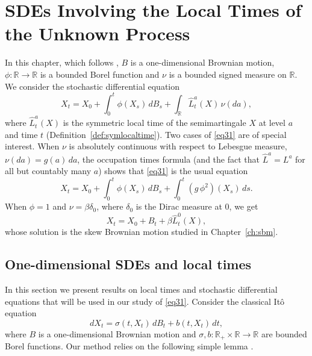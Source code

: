 \chapter{SDEs Involving the Local Times of the Unknown Process}\label{ch:local-times-unknown}

In this chapter, which follows \citet{LeGall1984}, $B$ is a one-dimensional
Brownian motion, $\phi:\mathbb{R}\to \mathbb{R}$ is a bounded Borel function
and $\nu$ is a bounded signed measure on $\mathbb{R}$. We consider the
stochastic differential equation
\begin{equation}\label{eq31}
	X_t=X_0 +\int_0^t \phi(X_s)\,dB_s+\int_\mathbb{R} \hat{L}_t^a (X)\, \nu(da),
\end{equation}
where $\hat{L}_t^a (X)$ is the symmetric local time of the semimartingale $X$ at
level $a$ and time $t$ (Definition~\ref{def:symlocaltime}). Two cases of
\eqref{eq31} are of special interest. When $\nu$ is absolutely continuous with
respect to Lebesgue measure, $\nu(da)=g(a)\,da$, the occupation times formula
(and the fact that $\hat{L}^a = L^a$ for all but countably many $a$) shows that
\eqref{eq31} is the usual equation
\begin{equation}\label{eq32}
	X_t=X_0 +\int_0^t \phi(X_s)\,dB_s+\int_0^t (g\, \phi^2)(X_s)\,ds .
\end{equation}
When $\phi=1$ and $\nu=\beta \delta_0$, where $\delta_0$ is the Dirac measure at
$0$, we get
\begin{equation}\label{eq33}
	X_t= X_0 + B_t + \beta \hat{L}_t^0 (X),
\end{equation}
whose solution is the skew Brownian motion studied in Chapter~\ref{ch:sbm}.

\section{One-dimensional SDEs and local times}

In this section we present results on local times and stochastic differential
equations that will be used in our study of \eqref{eq31}. Consider the
classical It\^o equation
\begin{equation}\label{eq34}
	dX_t=\sigma (t,X_t)\,dB_t + b(t,X_t)\,dt,
\end{equation}
where $B$ is a one-dimensional Brownian motion and
$\sigma , b :\mathbb{R}_+ \times \mathbb{R}\to \mathbb{R}$ are bounded Borel
functions. Our method relies on the following simple lemma
\citep[Lemma~IX.3.3]{RevuzYor1999}.

